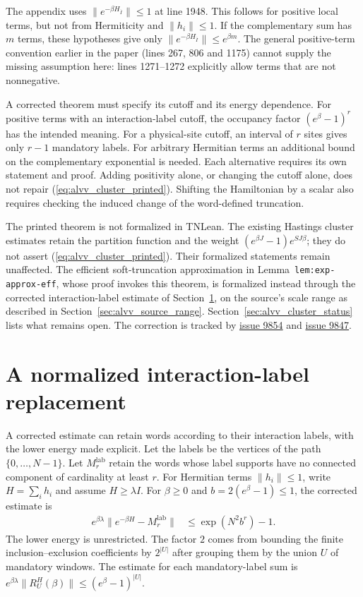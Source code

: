 \documentclass{article}
\begin{document}
The appendix uses $\|e^{-\beta H_{\overline I}}\|\le1$ at line 1948.
This follows for positive local terms, but not from Hermiticity and
$\|h_i\|\le1$. If the complementary sum has $m$ terms, these hypotheses
give only $\|e^{-\beta H_{\overline I}}\|\le e^{\beta m}$. The general
positive-term convention earlier in the paper (lines 267, 806 and 1175)
cannot supply the missing assumption here: lines 1271--1272 explicitly
allow terms that are not nonnegative.

A corrected theorem must specify its cutoff and its energy dependence.
For positive terms with an interaction-label cutoff, the occupancy factor
$(e^\beta-1)^r$ has the intended meaning. For a physical-site cutoff, an
interval of $r$ sites gives only $r-1$ mandatory labels. For arbitrary
Hermitian terms an additional bound on the complementary exponential is
needed. Each alternative requires its own statement and proof. Adding
positivity alone, or changing the cutoff alone, does not repair
(\ref{eq:alvv_cluster_printed}). Shifting the Hamiltonian by a scalar also
requires checking the induced change of the word-defined truncation.

The printed theorem is not formalized in TNLean. The existing Hastings
cluster estimates retain the partition function and the weight
$(e^{\beta J}-1)e^{SJ\beta}$; they do not assert
(\ref{eq:alvv_cluster_printed}). Their formalized statements remain
unaffected. The efficient soft-truncation approximation in
Lemma~\texttt{lem:exp-approx-eff}, whose proof invokes this theorem, is
formalized instead through the corrected interaction-label estimate of
Section~\ref{sec:alvv_normalized_label_replacement}, on the source's scale
range as described in Section~\ref{sec:alvv_source_range}.
Section~\ref{sec:alvv_cluster_status} lists what remains open. The correction is tracked by
\href{https://github.com/LionSR/TNLean/issues/9854}{issue 9854} and
\href{https://github.com/LionSR/TNLean/issues/9847}{issue 9847}.


\section{A normalized interaction-label replacement}
\label{sec:alvv_normalized_label_replacement}

A corrected estimate can retain words according to their interaction labels,
with the lower energy made explicit. Let the labels be the vertices of the
path $\{0,\ldots,N-1\}$. Let $M_r^{\mathrm{lab}}$ retain the words whose label
supports have no connected component of cardinality at least $r$.
For Hermitian terms $\|h_i\|\leq1$, write $H=\sum_i h_i$ and assume
$H\geq\lambda I$. For $\beta\geq0$ and $b=2(e^\beta-1)\leq1$, the corrected
estimate is
\begin{align}
    e^{\beta\lambda}\|e^{-\beta H}-M_r^{\mathrm{lab}}\|
     & \leq \exp(N^2b^r)-1.
    \label{eq:alvv_normalized_label_replacement}
\end{align}
The lower energy is unrestricted. The factor $2$ comes from bounding the
finite inclusion--exclusion coefficients by $2^{|U|}$ after grouping them by
the union $U$ of mandatory windows. The estimate for each mandatory-label
sum is $e^{\beta\lambda}\|R_U^H(\beta)\|\leq(e^\beta-1)^{|U|}$.
\end{document}
